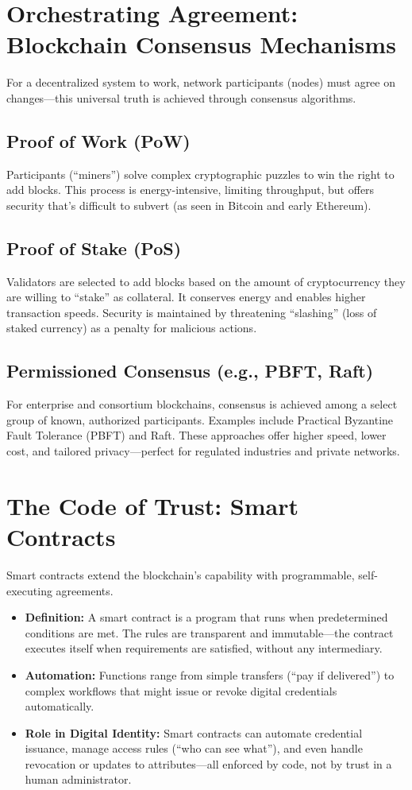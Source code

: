 \section{Orchestrating Agreement: Blockchain Consensus Mechanisms}
For a decentralized system to work, network participants (nodes) must agree on changes—this universal truth is achieved through consensus algorithms.

\subsection*{Proof of Work (PoW)}
Participants (“miners”) solve complex cryptographic puzzles to win the right to add blocks. This process is energy-intensive, limiting throughput, but offers security that’s difficult to subvert (as seen in Bitcoin and early Ethereum).

\subsection*{Proof of Stake (PoS)}
Validators are selected to add blocks based on the amount of cryptocurrency they are willing to “stake” as collateral. It conserves energy and enables higher transaction speeds. Security is maintained by threatening “slashing” (loss of staked currency) as a penalty for malicious actions.

\subsection*{Permissioned Consensus (e.g., PBFT, Raft)}
For enterprise and consortium blockchains, consensus is achieved among a select group of known, authorized participants. Examples include Practical Byzantine Fault Tolerance (PBFT) and Raft. These approaches offer higher speed, lower cost, and tailored privacy—perfect for regulated industries and private networks.

\section{The Code of Trust: Smart Contracts}
Smart contracts extend the blockchain’s capability with programmable, self-executing agreements.

\begin{itemize}
    \item \textbf{Definition:} A smart contract is a program that runs when predetermined conditions are met. The rules are transparent and immutable—the contract executes itself when requirements are satisfied, without any intermediary.
    \item \textbf{Automation:} Functions range from simple transfers (“pay if delivered”) to complex workflows that might issue or revoke digital credentials automatically.
    \item \textbf{Role in Digital Identity:} Smart contracts can automate credential issuance, manage access rules (“who can see what”), and even handle revocation or updates to attributes—all enforced by code, not by trust in a human administrator.
\end{itemize}

